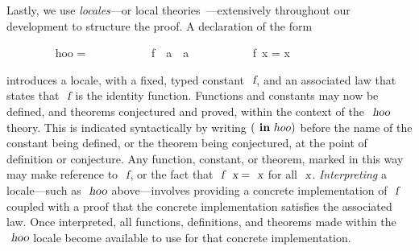 Lastly, we use \emph{locales}---or local theories~\cite{DBLP:conf/tphol/KammullerWP99,DBLP:conf/types/HaftmannW08}---extensively throughout our development to structure the proof.
A declaration of the form
\vspace{0.375em}
\begin{isabellebody}
\ \ \ \ \ \ \ \  hoo = \isanewline
\ \ \ \ \ \ \ \ \ \ \ f\ {\isacharcolon}{\isacharcolon}\ {\isachardoublequoteopen}{\isacharprime}a\ {\isasymRightarrow}\ {\isacharprime}a{\isachardoublequoteclose}\isanewline
\ \ \ \ \ \ \ \ \ \  {\isachardoublequoteopen}f\ x = x{\isachardoublequoteclose}
\end{isabellebody}
\vspace{0.375em}
\noindent
introduces a locale, with a fixed, typed constant $\isa{f}$, and an associated law that states that $\isa{f}$ is the identity function.
Functions and constants may now be defined, and theorems conjectured and proved, within the context of the $\isa{hoo}$ theory.
This is indicated syntactically by writing $(\isacommand{in}\ hoo)$ before the name of the constant being defined, or the theorem being conjectured, at the point of definition or conjecture.
Any function, constant, or theorem, marked in this way may make reference to $\isa{f}$, or the fact that $\isa{f}\ \isa{x} = \isa{x}$ for all $\isa{x}$.
\emph{Interpreting} a locale---such as $\isa{hoo}$ above---involves providing a concrete implementation of $\isa{f}$ coupled with a proof that the concrete implementation satisfies the associated law.
Once interpreted, all functions, definitions, and theorems made within the $\isa{hoo}$ locale become available to use for that concrete implementation.
